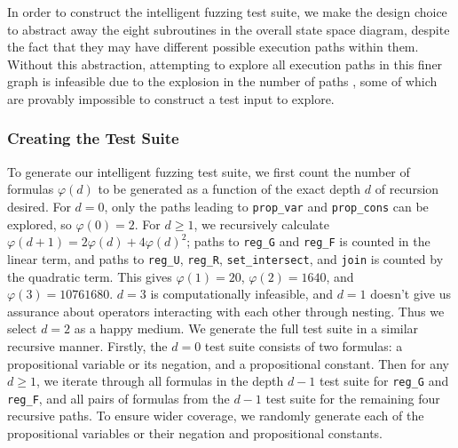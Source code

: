\documentclass[runningheads]{llncs}
\renewcommand{\phi}{\varphi}
\begin{document}
In order to construct the intelligent fuzzing test suite, we make the design choice to abstract away the eight subroutines in the overall state space diagram, despite the fact that they may have different possible execution paths within them. Without this abstraction, attempting to explore all execution paths in this finer graph is infeasible due to the explosion in the number of paths \cite{Pham_2016}, some of which are provably impossible to construct a test input to explore.
\subsubsection{Creating the Test Suite} %
To generate our intelligent fuzzing test suite, we first count the number of formulas $\phi(d)$ to be generated as a function of the exact depth $d$ of recursion desired. 
For $d = 0$, only the paths leading to \texttt{prop\_var} and \texttt{prop\_cons} can be explored, so $\phi(0) = 2$. For $d \geq 1$, we recursively calculate $\phi(d + 1) = 2\phi(d) + 4\phi(d)^2$; paths to \texttt{reg\_G} and \texttt{reg\_F} is counted in the linear term, and paths to \texttt{reg\_U}, \texttt{reg\_R}, \texttt{set\_intersect}, and \texttt{join} is counted by the quadratic term. 
This gives $\phi(1) = 20$, $\phi(2) = 1640$, and $\phi(3) = 10761680$. 
$d = 3$ is computationally infeasible, and $d = 1$ doesn't give us assurance about operators interacting with each other through nesting. Thus we select $d = 2$ as a happy medium. 
We generate the full test suite in a similar recursive manner. 
Firstly, the $d = 0$ test suite consists of two formulas: a propositional variable or its negation, and a propositional constant. 
Then for any $d \geq 1$, we iterate through all formulas in the depth $d-1$ test suite for \texttt{reg\_G} and \texttt{reg\_F}, and all pairs of formulas from the $d-1$ test suite for the remaining four recursive paths. 
To ensure wider coverage, we randomly generate each of the propositional variables or their negation and propositional constants.
\end{document}
